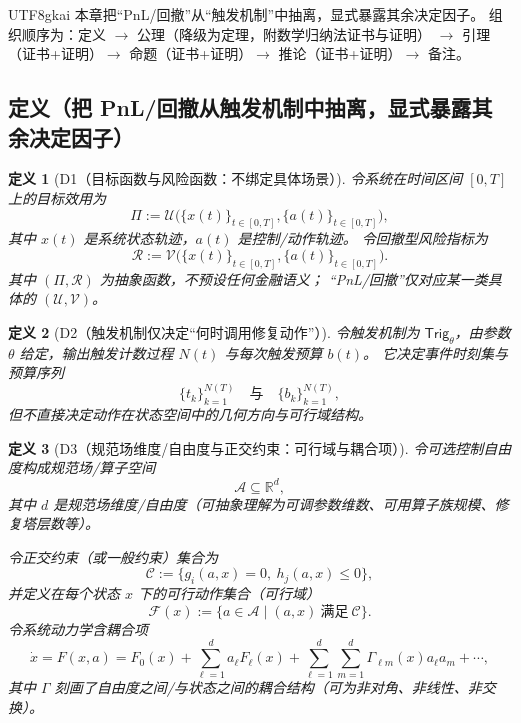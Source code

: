 \documentclass[12pt]{article}
\newtheorem{definition}{定义}[section]
\newcommand{\RR}{\mathbb{R}}
\begin{document}
\begin{CJK*}{UTF8}{gkai}
本章把“PnL/回撤”从“触发机制”中抽离，显式暴露其余决定因子。
组织顺序为：定义 $\rightarrow$ 公理（降级为定理，附数学归纳法证书与证明）
$\rightarrow$ 引理（证书+证明）$\rightarrow$ 命题（证书+证明）$\rightarrow$ 推论（证书+证明）$\rightarrow$ 备注。

\subsection{定义（把 PnL/回撤从触发机制中抽离，显式暴露其余决定因子）}
\label{subsec:tex28-ch6-defs}

\begin{definition}[D1（目标函数与风险函数：不绑定具体场景）]
\label{def:tex28-ch6-d1}
令系统在时间区间 $[0,T]$ 上的目标效用为
\[
  \Pi := \mathcal{U}\!\bigl(\{x(t)\}_{t\in[0,T]},\{a(t)\}_{t\in[0,T]}\bigr),
\]
其中 $x(t)$ 是系统状态轨迹，$a(t)$ 是控制/动作轨迹。
令回撤型风险指标为
\[
  \mathcal{R}:=\mathcal{V}\!\bigl(\{x(t)\}_{t\in[0,T]},\{a(t)\}_{t\in[0,T]}\bigr).
\]
其中 $(\Pi,\mathcal{R})$ 为抽象函数，不预设任何金融语义；
“PnL/回撤”仅对应某一类具体的 $(\mathcal{U},\mathcal{V})$。
\end{definition}

\begin{definition}[D2（触发机制仅决定“何时调用修复动作”）]
\label{def:tex28-ch6-d2}
令触发机制为 $\mathsf{Trig}_{\theta}$，由参数 $\theta$ 给定，输出触发计数过程 $N(t)$ 与每次触发预算 $b(t)$。
它决定事件时刻集与预算序列
\[
  \{t_k\}_{k=1}^{N(T)}
  \quad\text{与}\quad
  \{b_k\}_{k=1}^{N(T)},
\]
但不直接决定动作在状态空间中的几何方向与可行域结构。
\end{definition}

\begin{definition}[D3（规范场维度/自由度与正交约束：可行域与耦合项）]
\label{def:tex28-ch6-d3}
令可选控制自由度构成规范场/算子空间
\[
  \mathcal{A}\subseteq \RR^{d},
\]
其中 $d$ 是规范场维度/自由度（可抽象理解为可调参数维数、可用算子族规模、修复塔层数等）。

令正交约束（或一般约束）集合为
\[
  \mathcal{C}:=\{g_i(a,x)=0,\ h_j(a,x)\le 0\},
\]
并定义在每个状态 $x$ 下的可行动作集合（可行域）
\[
  \mathcal{F}(x):=\{a\in\mathcal{A}\mid (a,x)\ \text{满足}\ \mathcal{C}\}.
\]
令系统动力学含耦合项
\[
  \dot x = F(x,a) = F_0(x)
  + \sum_{\ell=1}^{d} a_\ell F_\ell(x)
  + \sum_{\ell=1}^{d}\sum_{m=1}^{d}\Gamma_{\ell m}(x)a_\ell a_m
  + \cdots,
\]
其中 $\Gamma$ 刻画了自由度之间/与状态之间的耦合结构（可为非对角、非线性、非交换）。
\end{definition}


\end{CJK*}
\end{document}

